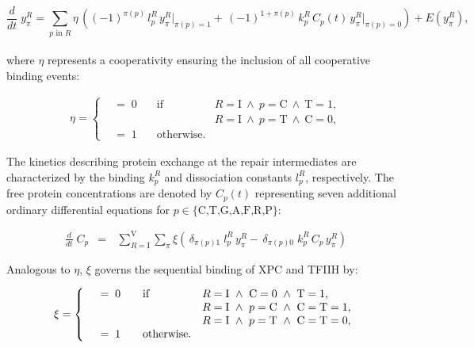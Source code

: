 \begin{equation}\label{eqn:DNAstatesModel}
\frac{d}{dt}\;y_{\pi}^{R} =\sum_{p\text{ in }R}\eta \, \left( (-1)^{\pi(p)} \,l_{p}^{ R}\, y_{\pi}^{R}\left. \right|_{\pi(p)=1}+  \, (-1)^{1+\pi(p)}\, k_{p}^{ R} \,C_p(t)\,y_{\pi}^{R}\left. \right|_{\pi(p)=0}\right ) +E(y_{\pi}^{R}),
\end{equation}\\
where $\eta$ represents a cooperativity ensuring the inclusion of all cooperative binding events:

\begin{align*}
\eta =\left\{
\begin{array}{llll}
& =\; 0 \quad   &\text{if}& R=\text{I} ~\wedge~ p=\text{C} ~\wedge~ \text{T}=1, \\
&     && R=\text{I} ~\wedge~ p=\text{T} ~\wedge~ \text{C}=0,\\
& = \; 1 \quad &\text{otherwise}.&
\end{array}
\right.
\end{align*}
  
The kinetics describing protein exchange at the repair intermediates are characterized by the binding $k_{p}^{ R}$ and dissociation constants $l_{p}^{ R}$, respectively. The free protein concentrations are denoted by $C_p(t)$ representing seven additional ordinary differential equations for $p \in \{\text{C,T,G,A,F,R,P}\}$:

\begin{eqnarray}\label{Eqn:concentration}
\frac{d}{dt}\;C_p&=&\,\sum_{R=\text{I}}^{\text{V}} \sum_{\pi} \xi \left( \,\delta_{\pi (p)1}\;l_{p}^{ R}\, y_{\pi}^{R}- \,\delta_{\pi (p)0}\; k_{p}^{ R} \,C_p\,y_{\pi}^{R}\right)
\end{eqnarray}  

Analogous to $\eta$, $\xi$ governs the sequential binding of XPC and TFIIH by:

\begin{align*}
\xi =\left\{
\begin{array}{l l ll}
& =\; 0 \quad   &\text{if} & R=\text{I} ~\wedge~ \text{C}=0 ~\wedge~ \text{T}=1, \\
&    && R=\text{I} ~\wedge~ p=\text{C} ~\wedge~ \text{C}=\text{T}=1, \\
&    &&R=\text{I} ~\wedge~ p=\text{T} ~\wedge~ \text{C}=\text{T}=0, \\
& = \; 1 \quad& \text{otherwise}.&
\end{array}
\right.
\end{align*}

